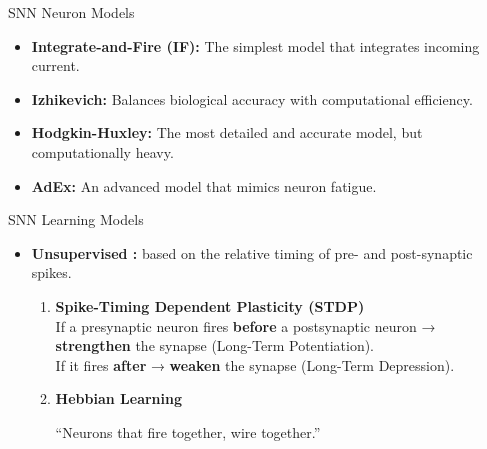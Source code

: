 \documentclass{beamer}
\begin{document}
\begin{frame}{SNN Neuron Models}
    \begin{itemize}
        \item \textbf{Integrate-and-Fire (IF):} The simplest model that integrates incoming current.
        \medskip
        \item \textbf{Izhikevich:} Balances biological accuracy with computational efficiency.
        \medskip
        \item \textbf{Hodgkin-Huxley:} The most detailed and accurate model, but computationally heavy.
        \medskip
        \item \textbf{AdEx:} An advanced model that mimics neuron fatigue.
    \end{itemize}
\end{frame}
    


\begin{frame}{SNN Learning Models}
    \begin{itemize}
        \item \textbf{Unsupervised :} based on the relative timing of pre- and post-synaptic spikes.
        \medskip
        \begin{enumerate}
            \item \textbf{Spike-Timing Dependent Plasticity (STDP)}\\
            If a presynaptic neuron fires \textbf{before} a postsynaptic neuron → \textbf{strengthen} the synapse (Long-Term Potentiation).\\
            \medskip
            If it fires \textbf{after} → \textbf{weaken} the synapse (Long-Term Depression).\\
        \medskip
            \item \textbf{Hebbian Learning}

            “Neurons that fire together, wire together.”\\
        \end{enumerate}

    \end{itemize}
\end{frame}
\end{document}
